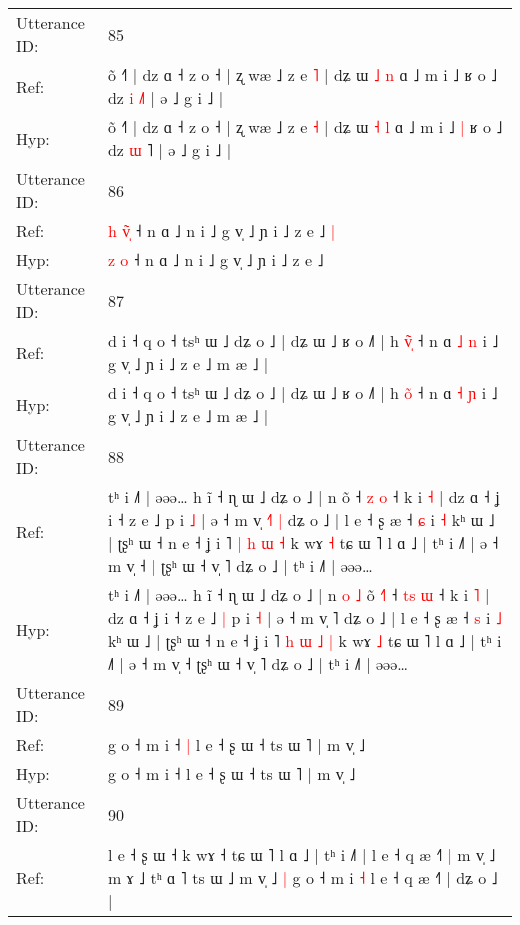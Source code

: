 \documentclass[10pt]{article}
\DeclareRobustCommand{\hl}[1]{{\textcolor{red}{#1}}}
\begin{document}
\begin{longtable}{ll}
 \\
\midrule
Utterance ID: & 85 \\
Ref: & õ ˧˥ | dz ɑ ˧ z o ˧ | ʐ wæ ˩ z e \hl{˥} | dʑ ɯ \hl{˩} \hl{n} ɑ ˩ m i ˩\hl{}\hl{} ʁ o ˩ dz \hl{i} \hl{˩}˥ | ə ˩ g i ˩ |
 \\
Hyp: & õ ˧˥ | dz ɑ ˧ z o ˧ | ʐ wæ ˩ z e \hl{˧} | dʑ ɯ \hl{˧} \hl{l} ɑ ˩ m i ˩\hl{ }\hl{|} ʁ o ˩ dz \hl{ɯ} \hl{}˥ | ə ˩ g i ˩ |
 \\
\midrule
Utterance ID: & 86 \\
Ref: & \hl{h} \hl{v}\hl{̃}\hl{̩} ˧ n ɑ ˩ n i ˩ g v̩ ˩ ɲ i ˩ z e ˩\hl{ }\hl{|}
 \\
Hyp: & \hl{z} \hl{}\hl{}\hl{o} ˧ n ɑ ˩ n i ˩ g v̩ ˩ ɲ i ˩ z e ˩\hl{}\hl{}
 \\
\midrule
Utterance ID: & 87 \\
Ref: & d i ˧ q o ˧ tsʰ ɯ ˩ dʑ o ˩ | dʑ ɯ ˩ ʁ o ˩˥ | h \hl{v}̃\hl{̩} ˧ n ɑ \hl{˩} \hl{n} i ˩ g v̩ ˩ ɲ i ˩ z e ˩ m æ ˩ |
 \\
Hyp: & d i ˧ q o ˧ tsʰ ɯ ˩ dʑ o ˩ | dʑ ɯ ˩ ʁ o ˩˥ | h \hl{o}̃\hl{} ˧ n ɑ \hl{˧} \hl{ɲ} i ˩ g v̩ ˩ ɲ i ˩ z e ˩ m æ ˩ |
 \\
\midrule
Utterance ID: & 88 \\
Ref: & tʰ i ˩˥ | əəə… h ĩ ˧ ɳ ɯ ˩ dʑ o ˩ | n\hl{}\hl{}\hl{}\hl{} õ\hl{}\hl{}\hl{} ˧ \hl{}\hl{z} \hl{o} ˧ k i \hl{˧} | dz ɑ ˧ ʝ i ˧ z e ˩\hl{}\hl{} p i \hl{˩} | ə ˧ m v̩ \hl{˧}˥\hl{ }\hl{|} dʑ o ˩ | l e ˧ ʂ æ ˧ \hl{ɕ} i \hl{˧} kʰ ɯ ˩ | ʈʂʰ ɯ ˧ n e ˧ ʝ i ˥ \hl{|} \hl{h} \hl{ɯ} \hl{˧} k wɤ \hl{˧} tɕ ɯ ˥ l ɑ ˩ | tʰ i ˩˥ | ə ˧ m v̩ ˧\hl{ }\hl{|} ʈʂʰ ɯ ˧ v̩ ˥ dʑ o ˩ | tʰ i ˩˥ | əəə…
 \\
Hyp: & tʰ i ˩˥ | əəə… h ĩ ˧ ɳ ɯ ˩ dʑ o ˩ | n\hl{ }\hl{o}\hl{ }\hl{˩} õ\hl{ }\hl{˧}\hl{˥} ˧ \hl{t}\hl{s} \hl{ɯ} ˧ k i \hl{˥} | dz ɑ ˧ ʝ i ˧ z e ˩\hl{ }\hl{|} p i \hl{˧} | ə ˧ m v̩ \hl{}˥\hl{}\hl{} dʑ o ˩ | l e ˧ ʂ æ ˧ \hl{s} i \hl{˩} kʰ ɯ ˩ | ʈʂʰ ɯ ˧ n e ˧ ʝ i ˥ \hl{h} \hl{ɯ} \hl{˩} \hl{|} k wɤ \hl{˩} tɕ ɯ ˥ l ɑ ˩ | tʰ i ˩˥ | ə ˧ m v̩ ˧\hl{}\hl{} ʈʂʰ ɯ ˧ v̩ ˥ dʑ o ˩ | tʰ i ˩˥ | əəə…
 \\
\midrule
Utterance ID: & 89 \\
Ref: & g o ˧ m i ˧\hl{ }\hl{|} l e ˧ ʂ ɯ ˧ ts ɯ ˥ | m v̩ ˩
 \\
Hyp: & g o ˧ m i ˧\hl{}\hl{} l e ˧ ʂ ɯ ˧ ts ɯ ˥ | m v̩ ˩
 \\
\midrule
Utterance ID: & 90 \\
Ref: & l e ˧ ʂ ɯ ˧ k wɤ ˧ tɕ ɯ ˥ l ɑ ˩ | tʰ i ˩˥ | l e ˧ q æ ˧\hl{˥}\hl{ }\hl{|} m v̩ ˩ m ɤ ˩ tʰ ɑ\hl{}\hl{} ˥\hl{}\hl{} ts ɯ ˩\hl{}\hl{} m v̩ ˩\hl{ }\hl{|} g o ˧ m i\hl{}\hl{} \hl{˧} l e ˧ q æ ˧˥ | dʑ o ˩ |

\end{longtable}
\end{document}
